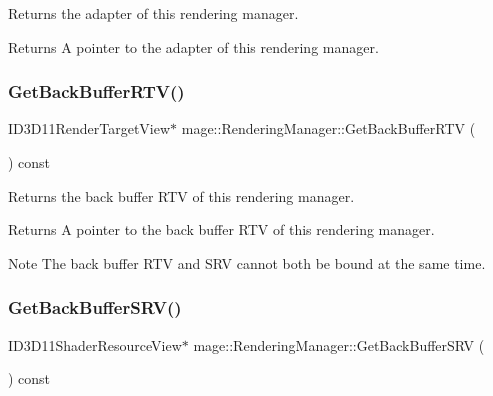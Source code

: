 Returns the adapter of this rendering manager.

\begin{DoxyReturn}{Returns}
A pointer to the adapter of this rendering manager. 
\end{DoxyReturn}
\hypertarget{classmage_1_1_rendering_manager_ad423bcea3c7eb151d82a75ebc808fa24}{}\label{classmage_1_1_rendering_manager_ad423bcea3c7eb151d82a75ebc808fa24} 
\subsubsection{\texorpdfstring{Get\+Back\+Buffer\+R\+T\+V()}{GetBackBufferRTV()}}
{\footnotesize\ttfamily I\+D3\+D11\+Render\+Target\+View$\ast$ mage\+::\+Rendering\+Manager\+::\+Get\+Back\+Buffer\+R\+TV (\begin{DoxyParamCaption}{ }\end{DoxyParamCaption}) const\hspace{0.3cm}{\ttfamily [noexcept]}}

Returns the back buffer R\+TV of this rendering manager.

\begin{DoxyReturn}{Returns}
A pointer to the back buffer R\+TV of this rendering manager. 
\end{DoxyReturn}
\begin{DoxyNote}{Note}
The back buffer R\+TV and S\+RV cannot both be bound at the same time. 
\end{DoxyNote}
\hypertarget{classmage_1_1_rendering_manager_a0c9d54f20055b68920bbf10811c11ce4}{}\label{classmage_1_1_rendering_manager_a0c9d54f20055b68920bbf10811c11ce4} 
\subsubsection{\texorpdfstring{Get\+Back\+Buffer\+S\+R\+V()}{GetBackBufferSRV()}}
{\footnotesize\ttfamily I\+D3\+D11\+Shader\+Resource\+View$\ast$ mage\+::\+Rendering\+Manager\+::\+Get\+Back\+Buffer\+S\+RV (\begin{DoxyParamCaption}{ }\end{DoxyParamCaption}) const\hspace{0.3cm}{\ttfamily [noexcept]}}

